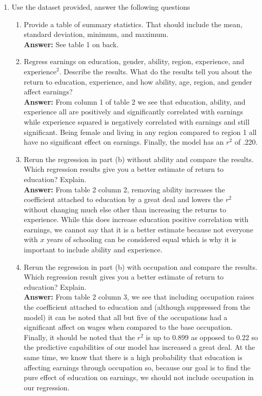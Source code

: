 \documentclass[11pt]{SelfArxOneColBMN}
\affiliation{\textsuperscript{1}\textit{John E. Walker Department of Economics,
Clemson University,Clemson, SC: email ijdavis@g.clemson.edu}}
\date{\small{Version ~\today}}
\begin{document}
\flushbottom

\maketitle

\begin{enumerate}
  \item Use the dataset provided, answer the following questions
  \begin{enumerate}[label=(\alph*)]
    \item Provide a table of summary statistics. That should include the mean, standard deviation, minimum, and maximum.\\
    \textbf{Answer: }See table 1 on back.
    \item Regress earnings on education, gender, ability, region, experience, and $\text{experience}^2$. Describe the results. What do the results tell you about the return to education, experience, and how ability, age, region, and gender affect earnings?\\
    \textbf{Answer: }From column 1 of table 2 we see that education, ability, and experience all are positively and significantly correlated with earnings while experience squared is negatively correlated with earnings and still significant. Being female and living in any region compared to region 1 all have no significant effect on earnings. Finally, the model has an $r^2$ of .220.
    \item Rerun the regression in part (b) without ability and compare the results. Which regression results give you a better estimate of return to education? Explain.\\
    \textbf{Answer: }From table 2 column 2, removing ability increases the coefficient attached to education by a great deal and lowers the $r^2$ without changing much else other than increasing the returns to experience. While this does increase education positive correlation with earnings, we cannot say that it is a better estimate because not everyone with $x$ years of schooling can be considered equal which is why it is important to include ability and experience.
    \item Rerun the regression in part (b) with occupation and compare the results. Which regression result gives you a better estimate of return to education? Explain.\\
    \textbf{Answer: }From table 2 column 3, we see that including occupation raises the coefficient attached to education and (although suppressed from the model) it can be noted that all but five of the occupations had a significant affect on wages when compared to the base occupation. Finally, it should be noted that the $r^2$ is up to 0.899 as opposed to 0.22 so the predictive capabilities of our model has increased a great deal. At the same time, we know that there is a high probability that education is affecting earnings through occupation so, because our goal is to find the pure effect of education on earnings, we should not include occupation in our regression. 

\end{enumerate}
\end{enumerate}
\end{document}
